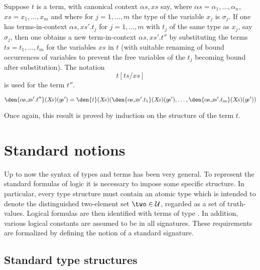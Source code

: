 Suppose $t$ is a term, with canonical context $\alpha\!s,\!x\!s$ say,
where $\alpha\!s = \alpha_1,\ldots,\alpha_n$, $x\!s = x_1,\ldots,x_m$
and where for $j=1,\ldots,m$ the type of the variable $x_j$ is
$\sigma_j$. If one has terms-in-context $\alpha\!s,\!x\!s'.t_{j}$ for
$j=1,\ldots,m$ with $t_{j}$ of the same type as $x_{j}$, say
$\sigma_{j}$, then one obtains a new term-in-context
$\alpha\!s,\!x\!s'.t''$ by substituting the terms
$t\!s=t_1,\ldots,t_m$ for the variables $x\!s$ in $t$ (with suitable
renaming of bound occurrences of variables to prevent the free
variables of the $t_{j}$ becoming bound after substitution). The
notation
\[ 
t[t\!s/x\!s]  
\]  
is used for the term $t''$. 

\medskip
 
\[ 
\den{\alpha\!s,\!x\!s'.t''}(X\!s)(y\!s') = \den{t}(X\!s)(
\den{\alpha\!s,\!x\!s'.t_{1}}(X\!s)(y\!s'),\ldots,
\den{\alpha\!s,\!x\!s'.t_{m}}(X\!s)(y\!s'))
\]

\medskip

Once again, this result is proved by induction on the structure of
the term $t$.


\section{Standard notions}

Up to now the syntax of types and terms  has been  very general.   To
represent the standard  formulas  of  logic  it  is  necessary  to 
impose  some specific structure. In  particular, every  type  structure
must contain  an atomic type  which  is  intended  to  denote
the  distinguished two-element set $\two\in{\cal U}$, regarded as a set
of  truth-values.  Logical formulas are then identified with
terms of  type .   In addition, various
logical  constants  are  assumed  to  be  in  all  signatures.    These
requirements are  formalized  by  defining  the  notion  of  a 
standard signature.

\subsection{Standard type structures}
\label{standard-type-structures}


